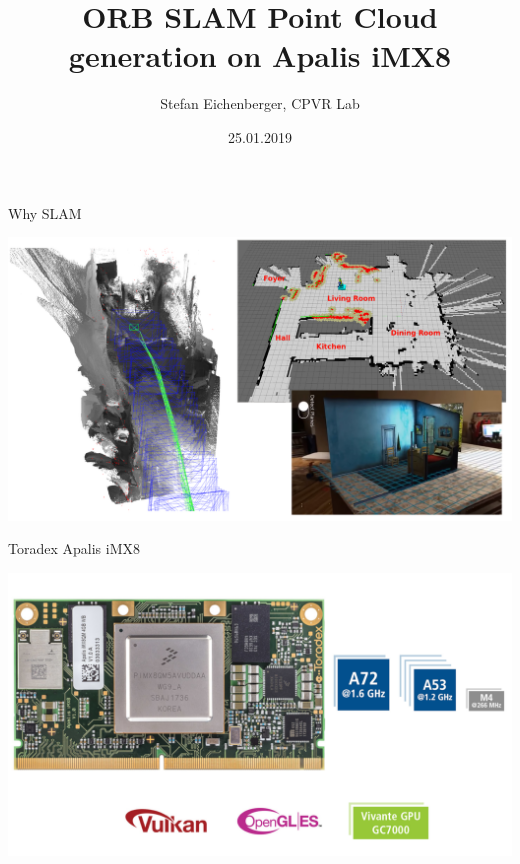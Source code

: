 \documentclass[aspectratio=169]{beamer}
\begin{document}
\obeylines

\title[ORB SLAM Point Cloud generation on Apalis iMX8]{ORB SLAM Point Cloud generation on Apalis iMX8}
\author{Stefan Eichenberger, CPVR Lab}
\date{25.01.2019}


\begin{frame}
  \titlepage\thispagestyle{empty}
\end{frame}


\begin{frame}{Why SLAM}
  \begin{center}
    \includegraphics[height=0.9\textheight]{./img/slam_usecases.png}
  \end{center}
\end{frame}

\note{
}

\begin{frame}{Toradex Apalis iMX8}
  \begin{center}
    \includegraphics[height=0.9\textheight]{./img/apalis_imx8_slide.png}
  \end{center}
\end{frame}
\end{document}
